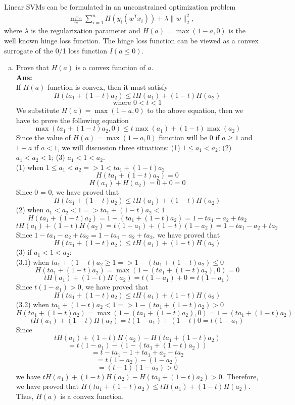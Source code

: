 \documentclass[11pt]{article}
\begin{document}
Linear SVMs can be formulated in an unconstrained optimization problem
\begin{align}\label{SVM}
\min_{w}\sum_{i=1}^n H(y_i(w^Tx_i)) + \lambda\|w\|_2^2,
\end{align}
where $\lambda$ is the regularization parameter and $H(a) = \max(1-a,0)$ is the well known hinge loss function. The hinge loss function can be viewed as a convex surrogate of the 0/1 loss function $I(a \leq 0)$.
\begin{enumerate}[(a)]
\item Prove that $H(a)$ is a convex function of $a$.\\
\textbf{Ans:}\\
If $H(a)$ function is convex, then it must satisfy
$$H(ta_1 + (1-t)a_2) \leq tH(a_1) + (1-t)H(a_2)$$
$$\text{where } 0 < t < 1$$
We substitute $H(a) = \max(1-a, 0)$ to the above equation, then we have to prove the following equation
$$\max(ta_1 + (1-t)a_2, 0) \leq t\max(a_1) + (1-t)\max(a_2)$$
Since the value of $H(a) = \max(1-a, 0)$ function will be 0 if $a \geq 1$ and $1-a$ if $a < 1$, we will discussion three situations: (1) $1 \leq a_1 < a_2$; (2) $a_1 < a_2 < 1$; (3) $a_1 < 1 < a_2$.\\
(1) when $1 \leq a_1 < a_2 => 1 < ta_1 + (1-t)a_2$ 
$$H(ta_1 + (1-t)a_2) = 0$$
$$H(a_1) + H(a_2) = 0 + 0 = 0$$
Since 0 = 0, we have proved that 
$$H(ta_1 + (1-t)a_2) \leq tH(a_1) + (1-t)H(a_2)$$
(2) when $a_1 < a_2 < 1 => ta_1 + (1-t)a_2 < 1$\\
$$H(ta_1 + (1-t)a_2) = 1 - (ta_1 + (1-t)a_2) = 1 - ta_1 - a_2 + ta_2$$
$$tH(a_1) + (1-t)H(a_2) = t(1-a_1) + (1-t)(1-a_2) = 1 - ta_1 - a_2 + ta_2$$
Since $1 - ta_1 - a_2 + ta_2 = 1 - ta_1 - a_2 + ta_2$, we have proved that 
$$H(ta_1 + (1-t)a_2) \leq tH(a_1) + (1-t)H(a_2)$$
(3) if $a_1 < 1 < a_2$:\\
(3.1) when $ta_1 + (1-t)a_2 \geq 1 => 1- (ta_1 + (1-t)a_2) \leq 0$
$$H(ta_1 + (1-t)a_2) = \max(1- (ta_1 + (1-t)a_2),0) = 0$$
$$tH(a_1) + (1-t)H(a_2) = t(1-a_1) + 0 = t(1-a_1)$$
Since $t(1-a_1) > 0$, we have proved that 
$$H(ta_1 + (1-t)a_2) \leq tH(a_1) + (1-t)H(a_2)$$
(3.2) when $ta_1 + (1-t)a_2 < 1 => 1- (ta_1 + (1-t)a_2) > 0$
$$H(ta_1 + (1-t)a_2) = \max(1 - (ta_1 + (1-t)a_2), 0) = 1 - (ta_1 + (1-t)a_2)$$
$$tH(a_1) + (1-t)H(a_2) = t(1-a_1) + (1-t)0 = t(1-a_1)$$
Since 
$$tH(a_1) + (1-t)H(a_2) - H(ta_1 + (1-t)a_2)$$ 
$$= t(1-a_1) - (1 - (ta_1 + (1-t)a_2))$$
$$= t - ta_1 - 1 + ta_1 + a_2 - ta_2$$
$$= t(1-a_2) - (1-a_2)$$
$$= (t-1)(1-a_2) > 0$$
we have $tH(a_1) + (1-t)H(a_2) - H(ta_1 + (1-t)a_2) > 0$.
Therefore, we have proved that $H(ta_1 + (1-t)a_2) \leq tH(a_1) + (1-t)H(a_2)$. Thus, $H(a)$ is a convex function.\\


\end{enumerate}
\end{document}
